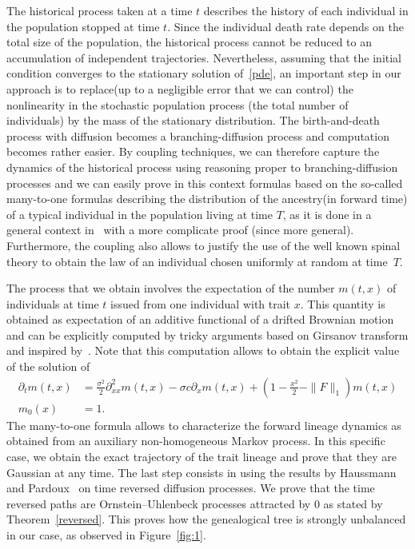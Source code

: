 \documentclass[AHL,Unicode,longabstracts,published]{cedram}
\begin{document}
The historical process taken at a time $t$ describes the history of each individual in the population stopped at time $t$. Since the individual death rate depends on the total size of the population, the historical process cannot be reduced to an accumulation of independent trajectories. Nevertheless, assuming that the initial condition converges to the stationary solution of~\eqref{pde}, an important step in our approach is to replace\linebreak (up to a negligible error that we can control) the nonlinearity in the stochastic population process (the total number of individuals) by the mass of the stationary distribution. The birth-and-death process with diffusion becomes a branching-diffusion process and computation becomes rather easier. By coupling techniques, we can therefore capture the dynamics of the historical process using reasoning proper to branching-diffusion processes and we can easily prove in this context formulas based on the so-called many-to-one formulas describing the distribution of the ancestry\linebreak (in forward time) of a typical individual in the population living at time $T$, as it is done in a general context in~\cite{Marguet2} with a more complicate proof (since more general). Furthermore, the coupling also allows to justify the use of the well known spinal theory to obtain the law of an individual chosen uniformly at random at time~$T$.



The process that we obtain involves the expectation of the number $m(t,x)$ of individuals at time $t$ issued from one individual with trait $x$. This quantity is obtained as expectation of an additive functional of a drifted Brownian motion and can be explicitly computed by tricky arguments based on Girsanov transform and inspired by~\cite{fitzsimmons1993markovian}. Note that this computation allows to obtain the explicit value of the solution of
\begin{equation}\label{eq:m-intro}
\begin{split}
\partial_{t} m{(t,x)} &=\frac{\sigma^2}{2}\partial^2_{xx}m{(t,x)}-\sigma c\partial_{x}m{(t,x)}+\left (1-\frac{x^2}{2}-\|F\|_1\right)m{(t,x)} 
\\
m_{0}(x) &=1.
\end{split}
\end{equation}
The many-to-one formula allows to characterize the forward lineage dynamics as obtained from an auxiliary non-homogeneous Markov process. In this specific case, we obtain the exact trajectory of the trait lineage and prove that they are Gaussian at any time. The last step consists in using the results by Haussmann and Pardoux~\cite{haussmannpardoux} on time reversed diffusion processes. We prove that the time reversed paths are Ornstein--Uhlenbeck processes attracted by $0$ as stated by Theorem~\ref{reversed}. This proves how the genealogical tree is strongly unbalanced in our case, as observed in Figure~\ref{fig:1}.
\end{document}
